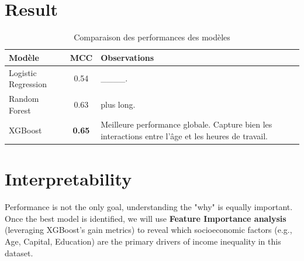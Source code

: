 \section{Result}

\begin{table}[H]
    \centering
    \caption{Comparaison des performances des modèles}
    \label{tab:model_comparison}

    \begin{tabularx}{\textwidth}{l c X}

        \toprule
        \textbf{Modèle} & \textbf{MCC} & \textbf{Observations} \\
        \midrule %

        Logistic Regression & 0.54 & ____. \\
        \addlinespace %

        Random Forest & 0.63 &  plus long. \\
        \addlinespace

        XGBoost & \textbf{0.65} & Meilleure performance globale. Capture bien les interactions entre l'âge et les heures de travail. \\

        \bottomrule %

    \end{tabularx}
\end{table}

\section{Interpretability}
Performance is not the only goal, understanding the "why" is equally important. Once the best model is identified, we will use
\textbf{Feature Importance analysis} (leveraging XGBoost's gain metrics) to reveal which socioeconomic factors (e.g., Age, Capital, Education)
are the primary drivers of income inequality in this dataset.


